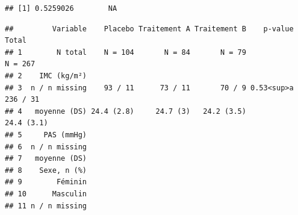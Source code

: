 \documentclass[
]{book}
\newenvironment{Shaded}{\begin{snugshade}}{\end{snugshade}}
\newcommand{\AttributeTok}[1]{\textcolor[rgb]{0.13,0.29,0.53}{#1}}
\newcommand{\CommentTok}[1]{\textcolor[rgb]{0.56,0.35,0.01}{\textit{#1}}}
\newcommand{\DecValTok}[1]{\textcolor[rgb]{0.00,0.00,0.81}{#1}}
\newcommand{\FunctionTok}[1]{\textcolor[rgb]{0.13,0.29,0.53}{\textbf{#1}}}
\newcommand{\NormalTok}[1]{#1}
\newcommand{\OtherTok}[1]{\textcolor[rgb]{0.56,0.35,0.01}{#1}}
\newcommand{\SpecialCharTok}[1]{\textcolor[rgb]{0.81,0.36,0.00}{\textbf{#1}}}
\newcommand{\StringTok}[1]{\textcolor[rgb]{0.31,0.60,0.02}{#1}}
\begin{document}
\begin{verbatim}
## [1] 0.5259026        NA
\end{verbatim}

\begin{Shaded}
\end{Shaded}

\begin{verbatim}
##         Variable    Placebo Traitement A Traitement B    p-value      Total
## 1        N total    N = 104       N = 84       N = 79               N = 267
## 2    IMC (kg/m²)                                                           
## 3  n / n missing    93 / 11      73 / 11       70 / 9 0.53<sup>a   236 / 31
## 4   moyenne (DS) 24.4 (2.8)     24.7 (3)   24.2 (3.5)            24.4 (3.1)
## 5     PAS (mmHg)                                                           
## 6  n / n missing                                                           
## 7   moyenne (DS)                                                           
## 8    Sexe, n (%)                                                           
## 9        Féminin                                                           
## 10      Masculin                                                           
## 11 n / n missing
\end{verbatim}
\end{document}
